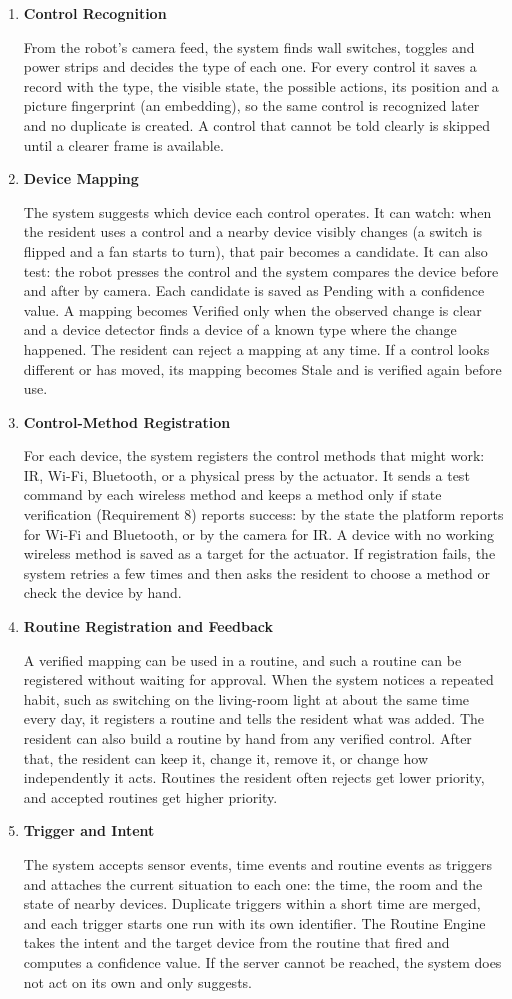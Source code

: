 \documentclass[conference]{IEEEtran}
\newcommand{\itemhead}[1]{\item \textbf{#1}\par\nobreak}
\begin{document}
\begin{enumerate}
\itemhead{Control Recognition}
From the robot's camera feed, the system finds wall switches, toggles and power strips and decides the type of each one. For every control it saves a record with the type, the visible state, the possible actions, its position and a picture fingerprint (an embedding), so the same control is recognized later and no duplicate is created. A control that cannot be told clearly is skipped until a clearer frame is available.

\itemhead{Device Mapping}
The system suggests which device each control operates. It can watch: when the resident uses a control and a nearby device visibly changes (a switch is flipped and a fan starts to turn), that pair becomes a candidate. It can also test: the robot presses the control and the system compares the device before and after by camera. Each candidate is saved as Pending with a confidence value. A mapping becomes Verified only when the observed change is clear and a device detector finds a device of a known type where the change happened. The resident can reject a mapping at any time. If a control looks different or has moved, its mapping becomes Stale and is verified again before use.

\itemhead{Control-Method Registration}
For each device, the system registers the control methods that might work: IR, Wi-Fi, Bluetooth, or a physical press by the actuator. It sends a test command by each wireless method and keeps a method only if state verification (Requirement 8) reports success: by the state the platform reports for Wi-Fi and Bluetooth, or by the camera for IR. A device with no working wireless method is saved as a target for the actuator. If registration fails, the system retries a few times and then asks the resident to choose a method or check the device by hand.

\itemhead{Routine Registration and Feedback}
A verified mapping can be used in a routine, and such a routine can be registered without waiting for approval. When the system notices a repeated habit, such as switching on the living-room light at about the same time every day, it registers a routine and tells the resident what was added. The resident can also build a routine by hand from any verified control. After that, the resident can keep it, change it, remove it, or change how independently it acts. Routines the resident often rejects get lower priority, and accepted routines get higher priority.

\itemhead{Trigger and Intent}
The system accepts sensor events, time events and routine events as triggers and attaches the current situation to each one: the time, the room and the state of nearby devices. Duplicate triggers within a short time are merged, and each trigger starts one run with its own identifier. The Routine Engine takes the intent and the target device from the routine that fired and computes a confidence value. If the server cannot be reached, the system does not act on its own and only suggests.


\end{enumerate}
\end{document}
